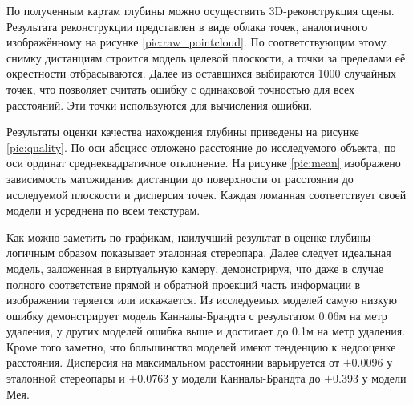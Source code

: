 
По полученным картам глубины можно осуществить 3D-реконструкция сцены. Результата реконструкции представлен  в виде облака точек, 
 аналогичного изображённому на рисунке \ref{pic:raw_pointcloud}. По соответствующим этому снимку дистанциям строится модель целевой плоскости, 
 а точки за пределами её окрестности отбрасываются. Далее из оставшихся выбираются 1000 случайных точек, что позволяет считать ошибку с 
 одинаковой точностью для всех расстояний.  %
Эти точки используются для вычисления ошибки. 


Результаты оценки качества нахождения глубины приведены на рисунке \ref{pic:quality}. По оси абсцисс отложено расстояние до исследуемого объекта,
по оси ординат среднеквадратичное отклонение. На рисунке \ref{pic:mean} изображено зависимость матожидания дистанции до поверхности от расстояния 
до исследуемой плоскости и дисперсия точек.  Каждая ломанная соответствует своей модели и усреднена по всем текстурам.



Как можно заметить по графикам, наилучший результат в оценке глубины логичным образом показывает эталонная стереопара. Далее следует 
идеальная модель, заложенная в виртуальную камеру, демонстрируя, что даже в случае полного соответствие прямой и обратной проекций часть 
информации в изображении теряется или искажается. Из исследуемых моделей самую низкую ошибку демонстрирует модель Канналы-Брандта с результатом
0.06м на метр удаления, у других моделей ошибка выше и достигает до 0.1м на метр удаления. Кроме того заметно, что большинство моделей имеют тенденцию
к недооценке расстояния.  Дисперсия на максимальном расстоянии варьируется от $\pm 0.0096$ у эталонной стереопары и $\pm 0.0763$ у модели Канналы-Брандта 
до $\pm 0.393$ у модели Мея. %



